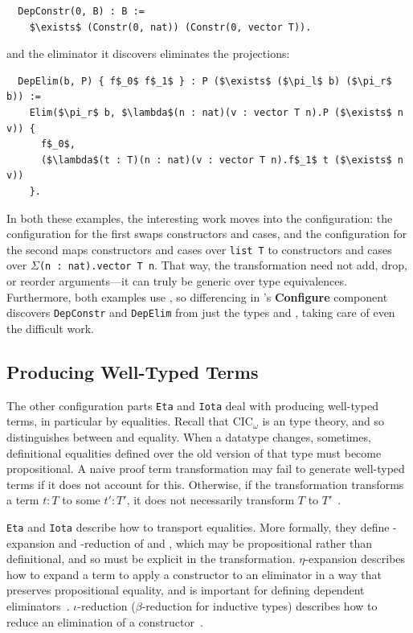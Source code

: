 \begin{lstlisting}
  DepConstr(0, B) : B :=
    $\exists$ (Constr(0, nat)) (Constr(0, vector T)).
\end{lstlisting}
and the eliminator it discovers eliminates the projections:

\begin{lstlisting}
  DepElim(b, P) { f$_0$ f$_1$ } : P ($\exists$ ($\pi_l$ b) ($\pi_r$ b)) :=
    Elim($\pi_r$ b, $\lambda$(n : nat)(v : vector T n).P ($\exists$ n v)) {
      f$_0$,
      ($\lambda$(t : T)(n : nat)(v : vector T n).f$_1$ t ($\exists$ n v))
    }.
\end{lstlisting}

In both these examples, the interesting work moves into the configuration:
the configuration for the first swaps constructors and cases,
and the configuration for the second maps constructors and cases over \lstinline{list T} to constructors and 
cases over $\Sigma$\lstinline{(n : nat).vector T n}. %
That way, the transformation need not add, drop, or reorder arguments---it can truly be generic over type equivalences.
Furthermore, both examples use , so differencing in \toolnamec's \textbf{Configure} component
discovers \lstinline{DepConstr} and \lstinline{DepElim} from just the types \Aa and \B, taking care of even the difficult work.

\subsection{Producing Well-Typed Terms}
\label{sec:pi-diff-equal}

The other configuration parts \lstinline{Eta} and \lstinline{Iota} deal with producing well-typed terms,
in particular by  equalities.
Recall that CIC$_{\omega}$ is an  type theory,
and so distinguishes between  and  equality.
When a datatype changes, sometimes, definitional equalities defined over the old version of that type must become propositional.
A naive proof term transformation may fail to generate well-typed terms if it does not account for this.
Otherwise, if the transformation transforms a term $t : T$ to some $t' : T'$, it does not necessarily
transform $T$ to $T'$~\cite{tabareau2019marriage}.

\lstinline{Eta} and \lstinline{Iota} describe how to transport equalities.
More formally, they define \kl{$\eta$}-expansion and \kl{$\iota$}-reduction of \Aa and \B,
which may be propositional rather than definitional,
and so must be explicit in the transformation.
$\eta$-expansion describes how to expand a term to apply a constructor to an eliminator in a way that preserves propositional equality,
and is important for defining dependent eliminators~\cite{nlab:eta-conversion}.
$\iota$-reduction ($\beta$-reduction for inductive types) describes how to reduce an elimination of a constructor~\cite{nlab:beta-reduction}.

